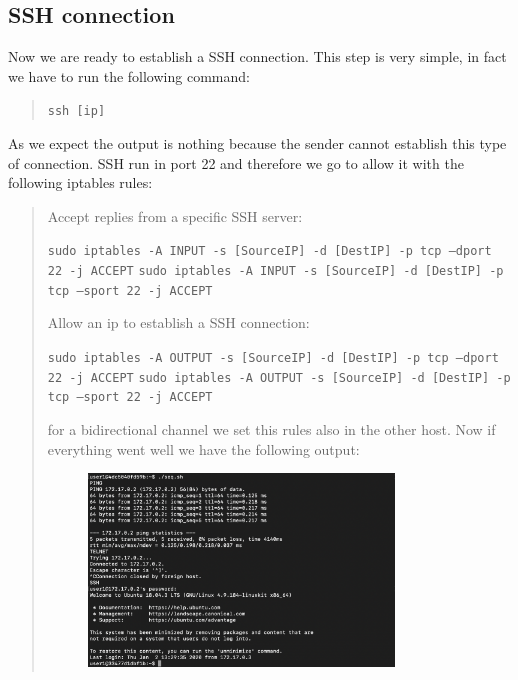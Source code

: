 \documentclass[11pt]{article}
\begin{document}
\subsection{SSH connection}
Now we are ready to establish a SSH connection. This step is very simple, in fact we have to run the following command:

\begin{quote}
 \texttt{ssh [ip]}\newline
\end{quote}

As we expect the output is nothing because the sender cannot establish this type of connection. SSH run in port 22 and therefore we go to allow it with the following iptables rules:

\begin{quote}
 Accept replies from a specific SSH server:

 \texttt{sudo iptables -A INPUT -s [SourceIP] -d [DestIP] -p tcp --dport 22 -j ACCEPT}\newline
 \texttt{sudo iptables -A INPUT -s [SourceIP] -d [DestIP] -p tcp --sport 22 -j ACCEPT}\newline

 Allow an ip to establish a SSH connection:

 \texttt{sudo iptables -A OUTPUT -s [SourceIP] -d [DestIP] -p tcp --dport 22 -j ACCEPT}\newline
 \texttt{sudo iptables -A OUTPUT -s [SourceIP] -d [DestIP] -p tcp --sport 22 -j ACCEPT}\newline

 for a bidirectional channel we set this rules also in the other host. Now if everything went well we have the following output:

 \begin{figure}[!ht]
 \centering
 \includegraphics[width=0.8\textwidth]{pic6-hw8-1635747}
 \label{fig:conf}
 \end{figure}
\end{quote}
\end{document}
